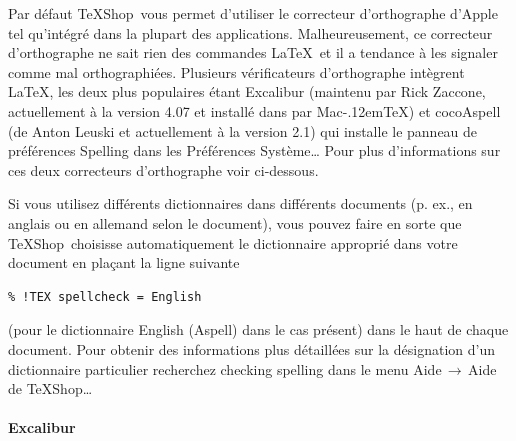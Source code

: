 \documentclass[11pt,french]{article}
\newcommand{\MacTeX}{Mac\kern-.12em\TeX}
\newcommand{\TS}{\textsf{\TeX Shop}}
\newcommand{\cmd}[1]{\textsf{#1}}
\newcommand{\mnu}[1]{\textsf{#1}}
\newcommand{\To}{\,\(\to\)\,}
\begin{document}

Par défaut \TS\ vous permet d'utiliser le correcteur d'orthographe d'Apple tel qu'intégré dans la plupart des applications. Malheureusement, ce correcteur d'orthographe ne sait rien des commandes \LaTeX\ et il a tendance à les signaler comme mal orthographiées. Plusieurs vérificateurs d'orthographe intègrent \LaTeX, les deux plus populaires étant \cmd{Excalibur} (maintenu par Rick Zaccone, actuellement à la version 4.07 et installé dans  par  \MacTeX) et \cmd{cocoAspell} (de Anton Leuski et actuellement à la version 2.1) qui installe le panneau de préférences \cmd{Spelling} dans les \cmd{Préférences Système…} Pour plus d'informations sur ces deux correcteurs d'orthographe voir ci-dessous.

Si vous utilisez différents dictionnaires dans différents documents (p. ex., en anglais ou en allemand selon le document), vous pouvez faire en sorte que \TS\ choisisse automatiquement le dictionnaire approprié dans votre document en plaçant la ligne suivante

\begin{verbatim}
% !TEX spellcheck = English
\end{verbatim}
(pour le dictionnaire \cmd{English (Aspell)} dans le cas présent) dans le haut de chaque document. Pour obtenir des informations plus détaillées sur la désignation d'un dictionnaire particulier recherchez \cmd{checking spelling} dans le menu \mnu{Aide}\To\mnu{Aide de TeXShop…}

\paragraph{\cmd{Excalibur}}

%
\end{document}
